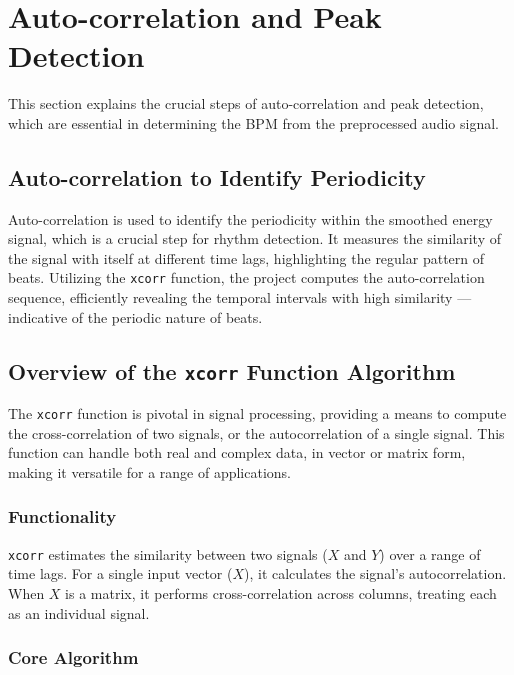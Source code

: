 \section{Auto-correlation and Peak Detection}

This section explains the crucial steps of auto-correlation and peak detection, which are essential in determining the BPM from the preprocessed audio signal.

\subsection{Auto-correlation to Identify Periodicity}

Auto-correlation is used to identify the periodicity within the smoothed energy signal, which is a crucial step for rhythm detection. It measures the similarity of the signal with itself at different time lags, highlighting the regular pattern of beats. Utilizing the \texttt{xcorr} function, the project computes the auto-correlation sequence, efficiently revealing the temporal intervals with high similarity — indicative of the periodic nature of beats.

\subsection{Overview of the \texttt{xcorr} Function Algorithm}

The \texttt{xcorr} function is pivotal in signal processing, providing a means to compute the cross-correlation of two signals, or the autocorrelation of a single signal. This function can handle both real and complex data, in vector or matrix form, making it versatile for a range of applications.

\subsubsection{Functionality}

\texttt{xcorr} estimates the similarity between two signals (\(X\) and \(Y\)) over a range of time lags. For a single input vector (\(X\)), it calculates the signal's autocorrelation. When \(X\) is a matrix, it performs cross-correlation across columns, treating each as an individual signal.

\subsubsection{Core Algorithm}

